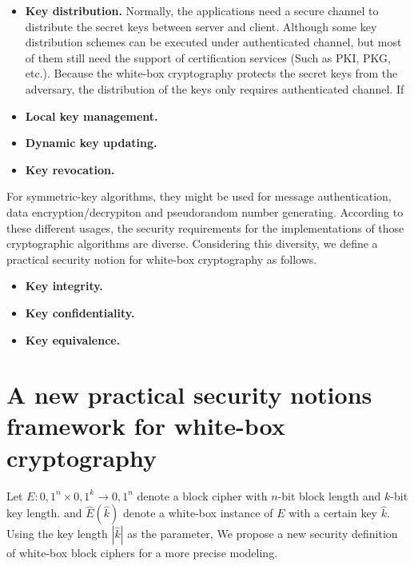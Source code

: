 \documentclass{SCIS2018}
\begin{document}
\begin{itemize}
\item \textbf{Key distribution.} Normally, the applications need a secure channel to distribute the secret keys between server and client. Although some key distribution schemes can be executed under authenticated channel, but most of them still need the support of certification services (Such as PKI, PKG, etc.). Because the white-box cryptography protects the secret keys from the adversary, the distribution of the keys only requires authenticated channel. If

\item \textbf{Local key management.}

\item \textbf{Dynamic key updating.}

\item \textbf{Key revocation.}
\end{itemize}

For symmetric-key algorithms, they might be used for message authentication, data encryption/decrypiton and pseudorandom number generating. According to these different usages, the security requirements for the implementations of those cryptographic algorithms are diverse. Considering this diversity, we define a practical security notion for white-box cryptography as follows.

\begin{itemize}
\item \textbf{Key integrity.}

\item \textbf{Key confidentiality.}

\item \textbf{Key equivalence.}
\end{itemize}

\section{A new practical security notions framework for white-box cryptography}

Let $E:{0,1}^{n}\times{0,1}^{k}\rightarrow{0,1}^{n}$ denote a block cipher with $n$-bit block length and $k$-bit key length. and $\hat{E}(\hat{k})$ denote a white-box instance of $E$ with a certain key $\hat{k}$. Using the key length $|\hat{k}|$ as the parameter, We propose a new security definition of white-box block ciphers for a more precise modeling.

\end{document}
